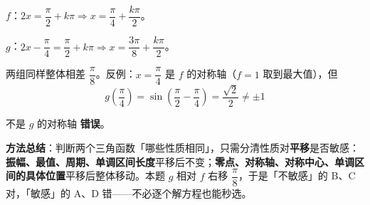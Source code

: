 \begin{answer}
$f$：$2x=\dfrac\pi2+k\pi\Rightarrow x=\dfrac\pi4+\dfrac{k\pi}2$。

$g$：$2x-\dfrac\pi4=\dfrac\pi2+k\pi\Rightarrow x=\dfrac{3\pi}8+\dfrac{k\pi}2$。

两组同样整体相差 $\dfrac\pi8$。反例：$x=\dfrac\pi4$ 是 $f$ 的对称轴（$f=1$ 取到最大值），但
\nopagebreak[4]
\[g\left(\frac\pi4\right)=\sin\left(\frac\pi2-\frac\pi4\right)=\frac{\sqrt2}2\ne\pm1\]

不是 $g$ 的对称轴  \textbf{错误}。

\begin{gktip}
\textbf{方法总结}：判断两个三角函数「哪些性质相同」，只需分清性质对\textbf{平移}是否敏感：\textbf{振幅、最值、周期、单调区间长度}平移后不变；\textbf{零点、对称轴、对称中心、单调区间的具体位置}平移后整体移动。本题 $g$ 相对 $f$ 右移 $\dfrac\pi8$，于是「不敏感」的 B、C 对，「敏感」的 A、D 错——不必逐个解方程也能秒选。
\end{gktip}


\par\medskip

\end{answer}
